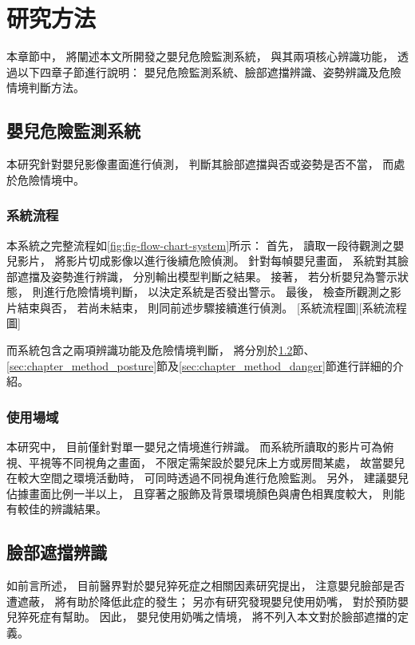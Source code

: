 \documentclass[class=NCU_thesis, crop=false]{standalone}
\begin{document}
\chapter{研究方法}
本章節中，
將闡述本文所開發之嬰兒危險監測系統，
與其兩項核心辨識功能，
透過以下四章子節進行說明：
嬰兒危險監測系統、臉部遮擋辨識、姿勢辨識及危險情境判斷方法。

\section{嬰兒危險監測系統}
本研究針對嬰兒影像畫面進行偵測，
判斷其臉部遮擋與否或姿勢是否不當，
而處於危險情境中。

\subsection{系統流程}
本系統之完整流程如\cref{fig:fig-flow-chart-system}所示：
首先，
讀取一段待觀測之嬰兒影片，
將影片切成影像以進行後續危險偵測。
針對每幀嬰兒畫面，
系統對其臉部遮擋及姿勢進行辨識，
分別輸出模型判斷之結果。
接著，
若分析嬰兒為警示狀態，
則進行危險情境判斷，
以決定系統是否發出警示。
最後，
檢查所觀測之影片結束與否，
若尚未結束，
則同前述步驟接續進行偵測。
[系統流程圖][系統流程圖]

而系統包含之兩項辨識功能及危險情境判斷，
將分別於\ref{sec:chapter_method_face}節、\ref{sec:chapter_method_posture}節及\ref{sec:chapter_method_danger}節進行詳細的介紹。


\subsection{使用場域}
本研究中，
目前僅針對單一嬰兒之情境進行辨識。
而系統所讀取的影片可為俯視、平視等不同視角之畫面，
不限定需架設於嬰兒床上方或房間某處，
故當嬰兒在較大空間之環境活動時，
可同時透過不同視角進行危險監測。
另外，
建議嬰兒佔據畫面比例一半以上，
且穿著之服飾及背景環境顏色與膚色相異度較大，
則能有較佳的辨識結果。

\section{臉部遮擋辨識}
\label{sec:chapter_method_face}
如前言所述，
目前醫界對於嬰兒猝死症之相關因素研究提出，
注意嬰兒臉部是否遭遮蔽，
將有助於降低此症的發生；
另亦有研究發現嬰兒使用奶嘴，
對於預防嬰兒猝死症有幫助。
因此，
嬰兒使用奶嘴之情境，
將不列入本文對於臉部遮擋的定義。
\end{document}
